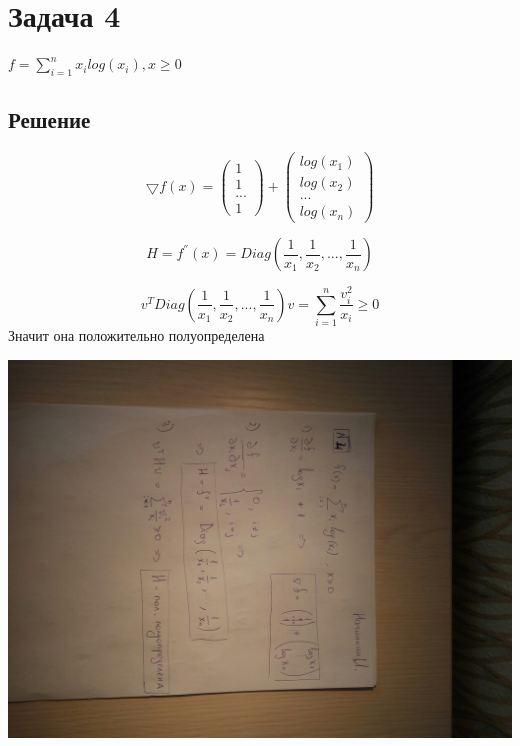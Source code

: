 \documentclass[a4paper]{article}
\begin{document}
\section*{Задача 4}
$f = \sum_{i=1}^{n}x_{i}log(x_{i}), x \geq 0$
\subsection*{Решение}

\begin{equation*}
\bigtriangledown{f}(x) = 
\begin{pmatrix}
1 \\ 1 \\ ... \\ 1
\end{pmatrix}
+
\begin{pmatrix}
log(x_{1}) \\ log(x_{2}) \\ ... \\ log(x_{n})  
\end{pmatrix}
\end{equation*}

\begin{equation*}
H = f^{''}(x) =  Diag(\frac{1}{x_{1}}, \frac{1}{x_{2}}, ... , \frac{1}{x_{n}})
\end{equation*}

\begin{equation*}
v^{T}Diag(\frac{1}{x_{1}}, \frac{1}{x_{2}}, ... , \frac{1}{x_{n}})v 
= \sum_{i=1}^{n}\frac{v_i^2}{x_i} \geq 0
\end{equation*}
Значит она положительно полуопределена


\includegraphics[scale=0.3, angle=90]{four}
\end{document}
